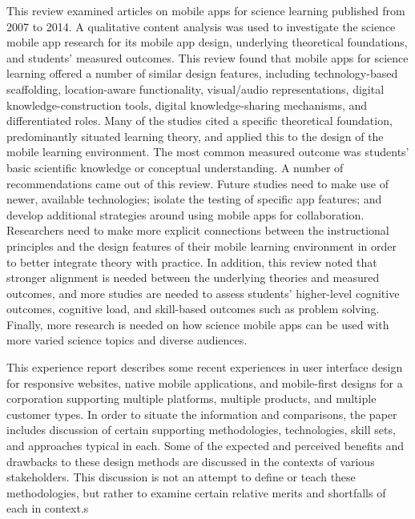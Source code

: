 \documentclass{article}
\begin{document}
\medskip
This review examined articles on mobile apps for science learning published from 2007 to 2014. A qualitative content analysis was used to investigate the science mobile app research for its mobile app design, underlying theoretical foundations, and students' measured outcomes. This review found that mobile apps for science learning offered a number of similar design features, including technology-based scaffolding, location-aware functionality, visual/audio representations, digital knowledge-construction tools, digital knowledge-sharing mechanisms, and differentiated roles. Many of the studies cited a specific theoretical foundation, predominantly situated learning theory, and applied this to the design of the mobile learning environment. The most common measured outcome was students' basic scientific knowledge or conceptual understanding. A number of recommendations came out of this review. Future studies need to make use of newer, available technologies; isolate the testing of specific app features; and develop additional strategies around using mobile apps for collaboration. Researchers need to make more explicit connections between the instructional principles and the design features of their mobile learning environment in order to better integrate theory with practice. In addition, this review noted that stronger alignment is needed between the underlying theories and measured outcomes, and more studies are needed to assess students' higher-level cognitive outcomes, cognitive load, and skill-based outcomes such as problem solving. Finally, more research is needed on how science mobile apps can be used with more varied science topics and diverse audiences. \cite{zydney2016mobile}

\medskip
This experience report describes some recent experiences in user interface design for responsive websites, native mobile applications, and mobile-first designs for a corporation supporting multiple platforms, multiple products, and multiple customer types. In order to situate the information and comparisons, the paper includes discussion of certain supporting methodologies, technologies, skill sets, and approaches typical in each. Some of the expected and perceived benefits and drawbacks to these design methods are discussed in the contexts of various stakeholders. This discussion is not an attempt to define or teach these methodologies, but rather to examine certain relative merits and shortfalls of each in context.\cite{mullins2015responsive}s

\printbibliography
\end{document}
